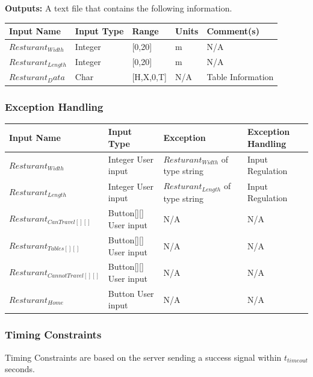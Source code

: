 \documentclass [10pt]{article}
\begin{document}
\textbf{Outputs: }A text file that contains the following information. \\

\begin{longtable}{|l|l|l|l|l|}\hline 
	\rowcolor{tableCell}\textbf{Input Name} & \textbf{Input Type} & \textbf{Range} & \textbf{Units} & \textbf{Comment(s)} \\ \hline
	$ Resturant_{Width} $ & Integer &  [0,20] & m &  N/A\\ \hline
	\rowcolor{tableCell}$ Resturant_{Length} $ & Integer  &  [0,20] & m &  N/A\\ \hline
	$ Resturant_Data $& Char  &  [H,X,0,T] & N/A & Table Information \\ \hline
\end{longtable}

\subsubsection{Exception Handling}

\begin{longtable}{|l|l|l|l|}\hline 
	\rowcolor{tableCell}\textbf{Input Name} & \textbf{Input Type} & \textbf{Exception} & \textbf{Exception Handling} \\ \hline
	$ Resturant_{Width} $ & Integer User input & $ Resturant_{Width} $ of type string &  Input Regulation \\ \hline
	\rowcolor{tableCell}$ Resturant_{Length} $ & Integer User input & $ Resturant_{Length} $ of type string &  Input Regulation \\ \hline
	$ Resturant_{CanTravel[][]} $ & Button[][] User input &  N/A & N/A  \\ \hline
	\rowcolor{tableCell}$ Resturant_{Tables[][]} $ & Button[][] User input &  N/A & N/A \\ \hline
	$ Resturant_{CannotTravel[][]} $ & Button[][] User input &  N/A & N/A  \\ \hline
	\rowcolor{tableCell}$ Resturant_{Home} $ & Button User input &  N/A & N/A  \\ \hline
\end{longtable}



\subsubsection{Timing Constraints}
Timing Constraints are based on the server sending a success signal within  $ t_{timeout} $ seconds.
\end{document}
